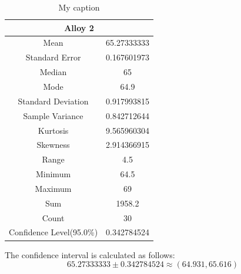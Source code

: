 \documentclass[letterpaper]{article}
\begin{document}
\begin{table}[H]
 \centering
 \begin{tabular}{|c|c|}
  \hline  \multicolumn{2}{|c|}{Alloy 2}  \\ \hline
  Mean                     & 65.27333333 \\ \hline
  Standard Error           & 0.167601973 \\ \hline
  Median                   & 65          \\ \hline
  Mode                     & 64.9        \\ \hline
  Standard Deviation       & 0.917993815 \\ \hline
  Sample Variance          & 0.842712644 \\ \hline
  Kurtosis                 & 9.565960304 \\ \hline
  Skewness                 & 2.914366915 \\ \hline
  Range                    & 4.5         \\ \hline
  Minimum                  & 64.5        \\ \hline
  Maximum                  & 69          \\ \hline
  Sum                      & 1958.2      \\ \hline
  Count                    & 30          \\ \hline
  Confidence Level(95.0\%) & 0.342784524 \\ \hline
 \end{tabular}
 \caption{My caption}
 \label{3a2}
\end{table}

The confidence interval is calculated as follows:
$$65.27333333 \pm 0.342784524 \approx (64.931, 65.616)$$
\end{document}
